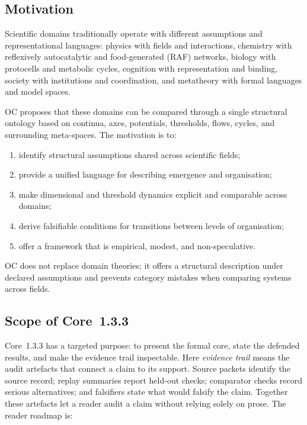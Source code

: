\subsection{Motivation}

Scientific domains traditionally operate with different assumptions and
representational languages: physics with fields and interactions, chemistry
with reflexively autocatalytic and food-generated (RAF) networks,
biology with protocells and metabolic cycles, cognition with representation and
binding, society with institutions and coordination, and metatheory with
formal languages and model spaces.

OC proposes that these domains can be compared through a single structural
ontology based on continua, axes, potentials, thresholds, flows, cycles, and
surrounding meta-spaces. The motivation is to:

\begin{enumerate}
    \item identify structural assumptions shared across scientific fields;
    \item provide a unified language for describing emergence and organisation;
    \item make dimensional and threshold dynamics explicit and comparable across domains;
    \item derive falsifiable conditions for transitions between levels of organisation;
    \item offer a framework that is empirical, modest, and non-speculative.
\end{enumerate}

OC does not replace domain theories; it offers a structural description under declared assumptions and prevents category mistakes when comparing systems across fields.

\subsection{Scope of Core~1.3.3}

Core~1.3.3 has a targeted purpose: to present the formal core, state the defended
results, and make the evidence trail inspectable. Here \emph{evidence trail}
means the audit artefacts that connect a claim to its support. Source packets
identify the source record; replay summaries report held-out checks; comparator
checks record serious alternatives; and falsifiers state what would falsify
the claim. Together these artefacts let a reader audit a claim without relying
solely on prose. The reader roadmap is:

